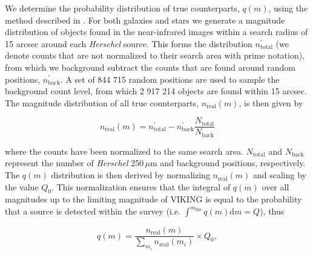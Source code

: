 \documentclass[fleqn,usenatbib]{mnras}
\newcommand{\dd}[1]{\mathrm{d}#1}
\begin{document}
We determine the probability distribution of true counterparts, $q(m)$, using the method described in \citealt{Ciliegi_2003}. For both galaxies and stars we generate a magnitude distribution of objects found in the near-infrared images within a search radius of 15 arcsec around each \textit{Herschel} source. This forms the distribution $n^{\prime}_{\textrm{total}}$ (we denote counts that are not normalized to their search area with prime notation), from which we background subtract the counts that are found around random positions, $n^{\prime}_{\textrm{back}}$. A set of 844 715 random positions are used to sample the background count level, from which 2 917 214 objects are found within 15 arcsec. The magnitude distribution of all true counterparts, $n_{\textrm{real}}(m)$, is then given by

\begin{equation}
\label{eq:real_distribution}
n_{\textrm{real}}(m) = n^{\prime}_{\textrm{total}} - n^{\prime}_{\textrm{back}} \frac{N_{\textrm{total}}}{N_{\textrm{back}}}
\end{equation}

\noindent where the counts have been normalized to the same search area. $N_{\textrm{total}}$ and $N_{\textrm{back}}$ represent the number of \textit{Herschel} 250\,$\mu$m and background positions, respectively. The $q(m)$ distribution is then derived by normalizing $n_{\textrm{real}}(m)$ and scaling by the value $Q_0$. This normalization ensures that the integral of $q(m)$ over all magnitudes up to the limiting magnitude of VIKING is equal to the probability that a source is detected within the survey (i.e. $\int^{m_{\textrm{lim}}} q(m) \dd{m} = Q$), thus

\begin{equation}
\label{eq:q_distribution}
q(m) = \frac{n_\textrm{real}(m)}{\sum_{m_i}n_\textrm{real}(m_i)}\times Q_0,
\end{equation}
\end{document}
